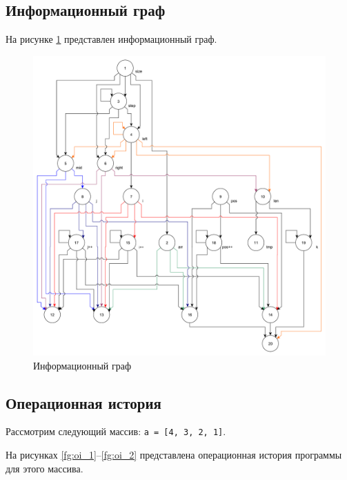 \clearpage

\subsection{Информационный граф}

На рисунке \ref{fg:ig} представлен информационный граф.

\begin{figure}[h]
	\centering
	\includegraphics[height=0.6\textheight]{img/информационный_граф.pdf}
	\caption{Информационный граф}
	\label{fg:ig}
\end{figure}

\clearpage

\subsection{Операционная история}

Рассмотрим следующий массив: \texttt{a = [4, 3, 2, 1]}.

На рисунках \ref{fg:oi_1}--\ref{fg:oi_2} представлена операционная история программы для этого массива.

